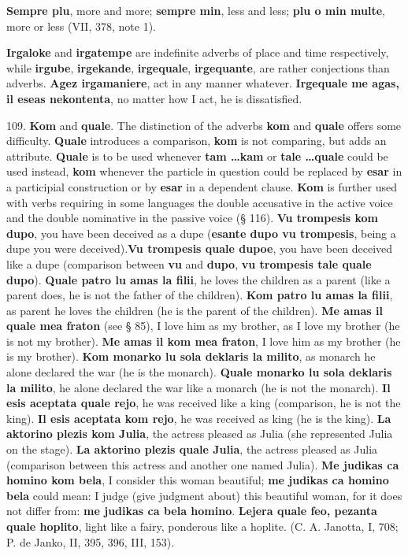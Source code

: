 \textbf{Sempre plu}, more and more; \textbf{sempre min}, less and less; \textbf{plu o min multe}, more or less (VII, 378, note 1).

\textbf{Irgaloke} and \textbf{irgatempe} are indefinite adverbs of place and time respectively, while \textbf{irgube}, \textbf{irgekande}, \textbf{irgequale}, \textbf{irgequante}, are rather conjections than adverbs. \textbf{Agez irgamaniere}, act in any manner whatever. \textbf{Irgequale me agas, il eseas nekontenta}, no matter how I act, he is dissatisfied.

109. \textbf{Kom} and \textbf{quale}. The distinction of the adverbs \textbf{kom} and \textbf{quale} offers some difficulty. \textbf{Quale} introduces a comparison, \textbf{kom} is not comparing, but adds an attribute. \textbf{Quale} is to be used whenever \textbf{tam \ldots kam} or \textbf{tale \ldots quale} could be used instead, \textbf{kom} whenever the particle in question could be replaced by \textbf{esar} in a participial construction or by \textbf{esar} in a dependent clause. \textbf{Kom} is further used with verbs requiring in some languages the double accusative in the active voice and the double nominative in the passive voice (§ 116). \textbf{Vu trompesis kom dupo}, you have been deceived as a dupe (\textbf{esante dupo vu trompesis}, being a dupe you were deceived).\textbf{Vu trompesis quale dupoe}, you have been deceived like a dupe (comparison between \textbf{vu} and \textbf{dupo}, \textbf{vu trompesis tale quale dupo}). \textbf{Quale patro lu amas la filii}, he loves the children as a parent (like a parent does, he is not the father of the children). \textbf{Kom patro lu amas la filii}, as parent he loves the children (he is the parent of the children). \textbf{Me amas il quale mea fraton} (see § 85), I love him as my brother, as I love my brother (he is not my brother). \textbf{Me amas il kom mea fraton}, I love him as my brother (he is my brother). \textbf{Kom monarko lu sola deklaris la milito}, as monarch he alone declared the war (he is the monarch). \textbf{Quale monarko lu sola deklaris la milito}, he alone declared the war like a monarch (he is not the monarch). \textbf{Il esis aceptata quale rejo}, he was received like a king (comparison, he is not the king). \textbf{Il esis aceptata kom rejo}, he was received as king (he is the king). \textbf{La aktorino plezis kom Julia}, the actress pleased as Julia (she represented Julia on the stage). \textbf{La aktorino plezis quale Julia}, the actress pleased as Julia (comparison between this actress and another one named Julia). \textbf{Me judikas ca homino kom bela}, I consider this woman beautiful; \textbf{me judikas ca homino bela} could mean: I judge (give judgment about) this beautiful woman, for it does not differ from: \textbf{me judikas ca bela homino}. \textbf{Lejera quale feo, pezanta quale hoplito}, light like a fairy, ponderous like a hoplite. (C. A. Janotta, I, 708; P. de Janko, II, 395, 396, III, 153).


